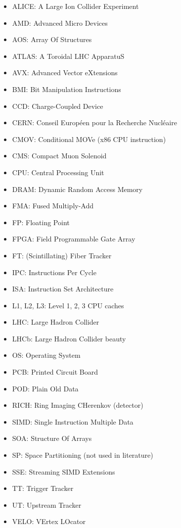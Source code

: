 \documentclass[12pt]{article}
\begin{document}
\begin{itemize}
	\item ALICE: A Large Ion Collider Experiment
	\item AMD: Advanced Micro Devices
	\item AOS: Array Of Structures
	\item ATLAS: A Toroidal LHC ApparatuS
	\item AVX: Advanced Vector eXtensions
	\item BMI: Bit Manipulation Instructions
	\item CCD: Charge-Coupled Device
	\item CERN:  Conseil Européen pour la Recherche Nucléaire
	\item CMOV: Conditional MOVe (x86 CPU instruction)
	\item CMS: Compact Muon Solenoid
	\item CPU: Central Processing Unit
	\item DRAM: Dynamic Random Access Memory
	\item FMA: Fused Multiply-Add
	\item FP: Floating Point
	\item FPGA: Field Programmable Gate Array
	\item FT: (Scintillating) Fiber Tracker
	\item IPC: Instructions Per Cycle
	\item ISA: Instruction Set Architecture
	\item L1, L2, L3: Level 1, 2, 3 CPU caches
	\item LHC: Large Hadron Collider
	\item LHCb: Large Hadron Collider beauty
	\item OS: Operating System
	\item PCB: Printed Circuit Board
	\item POD: Plain Old Data
	\item RICH: Ring Imaging CHerenkov (detector)
	\item SIMD: Single Instruction Multiple Data
	\item SOA: Structure Of Arrays
	\item SP: Space Partitioning (not used in literature)
	\item SSE: Streaming SIMD Extensions 
	\item TT: Trigger Tracker
	\item UT: Upstream Tracker
	\item VELO: VErtex LOcator
\end{itemize}
\end{document}
